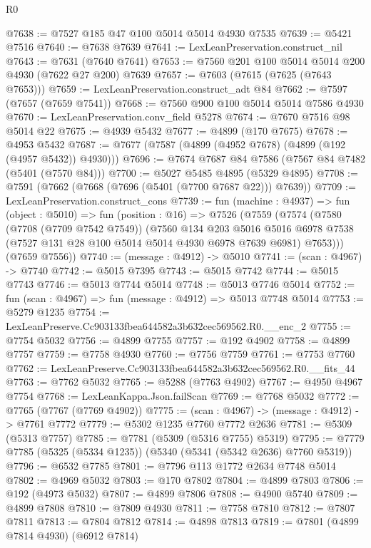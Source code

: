 \begin{lexlean}{R0}
\begin{coremodule}
@7638 := @7527 @185 @47 @100 @5014 @5014 @4930 @7535
@7639 := @5421 @7516
@7640 := @7638 @7639
@7641 := LexLeanPreservation.construct_nil
@7643 := @7631 (@7640 @7641)
@7653 := @7560 @201 @100 @5014 @5014 @200 @4930 (@7622 @27 @200) @7639
@7657 := @7603 (@7615 (@7625 (@7643 @7653)))
@7659 := LexLeanPreservation.construct_adt @84
@7662 := @7597 (@7657 (@7659 @7541))
@7668 := @7560 @900 @100 @5014 @5014 @7586 @4930
@7670 := LexLeanPreservation.conv_field @5278
@7674 := @7670 @7516 @98 @5014 @22
@7675 := @4939 @5432
@7677 := @4899 (@170 @7675)
@7678 := @4953 @5432
@7687 := @7677 (@7587 (@4899 (@4952 @7678) (@4899 (@192 (@4957 @5432)) @4930)))
@7696 := @7674 @7687 @84 @7586 (@7567 @84 @7482 (@5401 (@7570 @84)))
@7700 := @5027 @5485 @4895 (@5329 @4895)
@7708 := @7591 (@7662 (@7668 (@7696 (@5401 (@7700 @7687 @22))) @7639))
@7709 := LexLeanPreservation.construct_cons
@7739 := fun (machine : @4937) =>
  fun (object : @5010) =>
  fun (position : @16) =>
  @7526
    (@7559
      (@7574
        (@7580
          (@7708 (@7709 @7542 @7549))
          (@7560
            @134
            @203
            @5016
            @5016
            @6978
            @7538
            (@7527 @131 @28 @100 @5014 @5014 @4930 @6978 @7639 @6981)
            @7653)))
      (@7659 @7556))
@7740 := (message : @4912) -> @5010
@7741 := (scan : @4967) -> @7740
@7742 := @5015 @7395
@7743 := @5015 @7742
@7744 := @5015 @7743
@7746 := @5013 @7744 @5014
@7748 := @5013 @7746 @5014
@7752 := fun (scan : @4967) => fun (message : @4912) => @5013 @7748 @5014
@7753 := @5279 @1235
@7754 := LexLeanPreserve.Cc903133fbea644582a3b632cec569562.R0.__enc_2
@7755 := @7754 @5032
@7756 := @4899 @7755
@7757 := @192 @4902
@7758 := @4899 @7757
@7759 := @7758 @4930
@7760 := @7756 @7759
@7761 := @7753 @7760
@7762 := LexLeanPreserve.Cc903133fbea644582a3b632cec569562.R0.__fits_44
@7763 := @7762 @5032
@7765 := @5288 (@7763 @4902)
@7767 := @4950 @4967 @7754
@7768 := LexLeanKappa.Json.failScan
@7769 := @7768 @5032
@7772 := @7765 (@7767 (@7769 @4902))
@7775 := (scan : @4967) -> (message : @4912) -> @7761 @7772
@7779 := @5302 @1235 @7760 @7772 @2636
@7781 := @5309 (@5313 @7757)
@7785 := @7781 (@5309 (@5316 @7755) @5319)
@7795 := @7779 @7785 (@5325 (@5334 @1235)) (@5340 (@5341 (@5342 @2636) @7760 @5319))
@7796 := @6532 @7785
@7801 := @7796 @113 @1772 @2634 @7748 @5014
@7802 := @4969 @5032
@7803 := @170 @7802
@7804 := @4899 @7803
@7806 := @192 (@4973 @5032)
@7807 := @4899 @7806
@7808 := @4900 @5740
@7809 := @4899 @7808
@7810 := @7809 @4930
@7811 := @7758 @7810
@7812 := @7807 @7811
@7813 := @7804 @7812
@7814 := @4898 @7813
@7819 := @7801 (@4899 @7814 @4930) (@6912 @7814)

\end{coremodule}
\end{lexlean}
